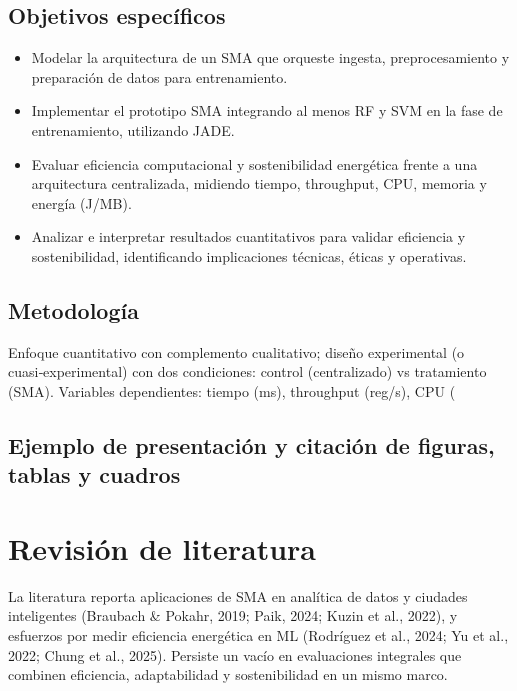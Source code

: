 \documentclass[12pt,twoside]{report}
\begin{document}
\section{Objetivos específicos}
\begin{itemize}
  \item Modelar la arquitectura de un SMA que orqueste ingesta, preprocesamiento y preparación de datos para entrenamiento.
  \item Implementar el prototipo SMA integrando al menos RF y SVM en la fase de entrenamiento, utilizando JADE.
  \item Evaluar eficiencia computacional y sostenibilidad energética frente a una arquitectura centralizada, midiendo tiempo, throughput, CPU, memoria y energía (J/MB).
  \item Analizar e interpretar resultados cuantitativos para validar eficiencia y sostenibilidad, identificando implicaciones técnicas, éticas y operativas.
\end{itemize}

\section{Metodología}
Enfoque cuantitativo con complemento cualitativo; diseño experimental (o cuasi‑experimental) con dos condiciones: control (centralizado) vs tratamiento (SMA). Variables dependientes: tiempo (ms), throughput (reg/s), CPU (%

\section{Ejemplo de presentación y citación de figuras, tablas y cuadros}

\chapter{Revisión de literatura}
La literatura reporta aplicaciones de SMA en analítica de datos y ciudades inteligentes (Braubach \& Pokahr, 2019; Paik, 2024; Kuzin et al., 2022), y esfuerzos por medir eficiencia energética en ML (Rodríguez et al., 2024; Yu et al., 2022; Chung et al., 2025). Persiste un vacío en evaluaciones integrales que combinen eficiencia, adaptabilidad y sostenibilidad en un mismo marco.
\end{document}
